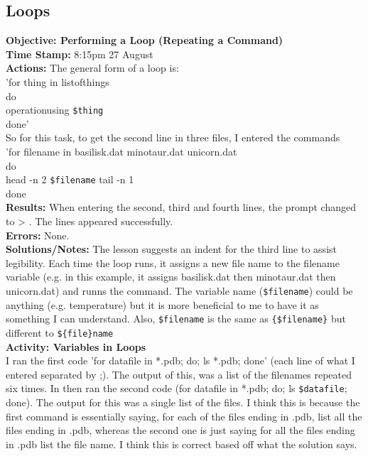 \documentclass{article}
\begin{document}
\begin{FlushLeft}
\subsection{Loops}
\textbf{Objective: Performing a Loop (Repeating a Command)}\\ 
\textbf{Time Stamp:} 8:15pm 27 August\\
\textbf{Actions:} The general form of a loop is: \\
'for thing in list\textunderscore of\textunderscore things\\
do\\
operation\textunderscore using \verb|$thing|\\
done'\\
So for this task, to get the second line in three files, I entered the commands\\
'for filename in basilisk.dat minotaur.dat unicorn.dat\\
do\\
head -n 2 \verb|$filename| \textbar{} tail -n 1\\
done\\
\textbf{Results:} When entering the second, third and fourth lines, the prompt changed to \textgreater{} . The lines appeared successfully. \\
\textbf{Errors:} None.\\
\textbf{Solutions/Notes:} The lesson suggests an indent for the third line to assist legibility. Each time the loop runs, it assigns a new file name to the filename variable (e.g. in this example, it assigns basilisk.dat then minotaur.dat then unicorn.dat) and runns the command. The variable name (\verb|$filename|) could be anything (e.g. temperature) but it is more beneficial to me to have it as something I can understand. Also, \verb|$filename| is the same as \verb|{$filename}| but different to \verb|${file}name|  \\
\vspace{5mm}
\textbf{Activity: Variables in Loops}\\
I ran the first code 'for datafile in *.pdb; do; ls *.pdb; done' (each line of what I entered separated by ;). The output of this, was a list of the filenames repeated six times. In then ran the second code (for datafile in *.pdb; do; ls \verb|$datafile|; done). The output for this was a single list of the files. I think this is because the first command is essentially saying, for each of the files ending in .pdb, list all the files ending in .pdb, whereas the second one is just saying for all the files ending in .pdb list the file name. I think this is correct based off what the solution says.\\

\end{FlushLeft}
\end{document}
